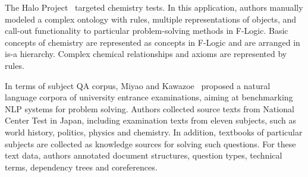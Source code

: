 The Halo Project~ targeted chemistry tests. In this application, authors manually modeled a complex ontology with rules, multiple representations of objects, and call-out functionality to particular problem-solving methods in F-Logic. Basic concepts of chemistry are represented as concepts in F-Logic and are arranged in is-a hierarchy. Complex chemical relationships and axioms are represented by rules.

In terms of subject QA corpus, Miyao and Kawazoe~ proposed a natural language corpora of university entrance examinations, aiming at benchmarking NLP systems for problem solving. Authors collected source texts from National Center Test in Japan, including examination texts from eleven subjects, such as world history, politics, physics and chemistry. In addition, 
textbooks of particular subjects are collected as knowledge sources for solving such questions. For these text data, authors annotated document structures, question types, technical terms, dependency trees and coreferences.
